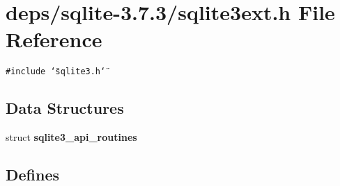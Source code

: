 \section{deps/sqlite-3.7.3/sqlite3ext.h File Reference}
\label{3_87_83_2sqlite3ext_8h}
{\tt \#include \char`\"{}sqlite3.h\char`\"{}}\par
\subsection*{Data Structures}
\begin{CompactItemize}
\item 
struct \bf{sqlite3\_\-api\_\-routines}
\end{CompactItemize}
\subsection*{Defines}
